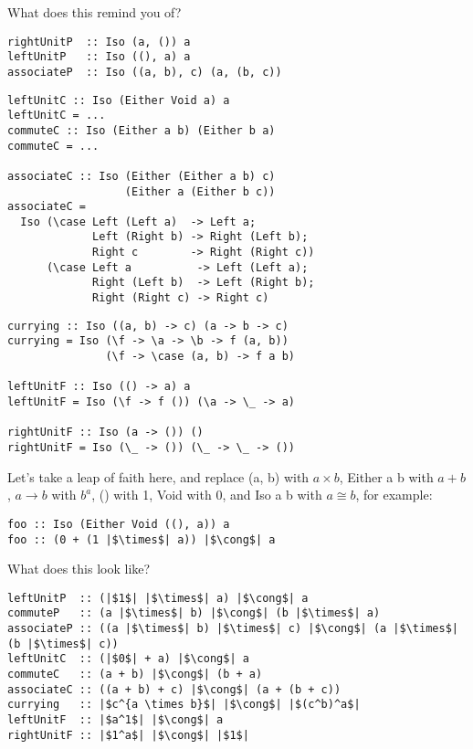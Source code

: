 \documentclass[tikz]{beamer}
\theoremstyle{definition}
\begin{document}
\begin{frame}[fragile]
What does this remind you of?

\begin{verbatim}
rightUnitP  :: Iso (a, ()) a
leftUnitP   :: Iso ((), a) a
associateP  :: Iso ((a, b), c) (a, (b, c))
\end{verbatim}
\end{frame}

\begin{frame}[fragile]
\begin{verbatim}
leftUnitC :: Iso (Either Void a) a
leftUnitC = ...
commuteC :: Iso (Either a b) (Either b a)
commuteC = ...

associateC :: Iso (Either (Either a b) c)
                  (Either a (Either b c))
associateC =
  Iso (\case Left (Left a)  -> Left a;
             Left (Right b) -> Right (Left b);
             Right c        -> Right (Right c))
      (\case Left a          -> Left (Left a);
             Right (Left b)  -> Left (Right b);
             Right (Right c) -> Right c)
\end{verbatim}
\end{frame}

\begin{frame}[fragile]
\begin{verbatim}
currying :: Iso ((a, b) -> c) (a -> b -> c)
currying = Iso (\f -> \a -> \b -> f (a, b))
               (\f -> \case (a, b) -> f a b)

leftUnitF :: Iso (() -> a) a
leftUnitF = Iso (\f -> f ()) (\a -> \_ -> a)

rightUnitF :: Iso (a -> ()) ()
rightUnitF = Iso (\_ -> ()) (\_ -> \_ -> ())
\end{verbatim}
\end{frame}

\begin{frame}[fragile]
Let's take a leap of faith here, and replace (a, b) with $a \times b$, Either a b with $a + b$, $a \rightarrow b$ with $b^a$, () with 1, Void with 0, and Iso a b with $a \cong b$, for example:

\begin{verbatim}
foo :: Iso (Either Void ((), a)) a
foo :: (0 + (1 |$\times$| a)) |$\cong$| a
\end{verbatim}
\end{frame}



\begin{frame}[fragile]
What does this look like?

\begin{verbatim}
leftUnitP  :: (|$1$| |$\times$| a) |$\cong$| a
commuteP   :: (a |$\times$| b) |$\cong$| (b |$\times$| a)
associateP :: ((a |$\times$| b) |$\times$| c) |$\cong$| (a |$\times$| (b |$\times$| c))
leftUnitC  :: (|$0$| + a) |$\cong$| a
commuteC   :: (a + b) |$\cong$| (b + a)
associateC :: ((a + b) + c) |$\cong$| (a + (b + c))
currying   :: |$c^{a \times b}$| |$\cong$| |$(c^b)^a$|
leftUnitF  :: |$a^1$| |$\cong$| a
rightUnitF :: |$1^a$| |$\cong$| |$1$|
\end{verbatim}
\end{frame}
\end{document}
